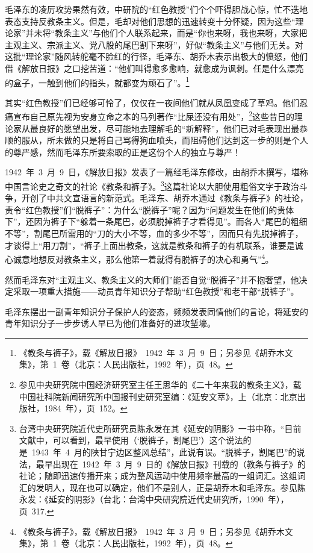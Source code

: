毛泽东的凌厉攻势果然有效，中研院的“红色教授”们个个吓得胆战心惊，忙不迭地表态支持反教条主义。但是，毛却对他们思想的迅速转变十分怀疑，因为这些“理论家”并未将“教条主义”与他们个人联系起来，而是“你也来呀，我也来呀，大家把主观主义、宗派主义、党八股的尾巴割下来呀”，好似“教条主义”与他们无关。对这批“理论家”随风转舵毫不脸红的行径，毛泽东、胡乔木表示出极大的愤怒，他们借《解放日报》之口挖苦道：“他们叫得愈多愈响，就愈成为讽刺。任是什么漂亮的盒子，一触到他们的指头，就都变为顽石了”。\footnote{《教条与裤子》，载《解放日报》~1942~年~3~月~9~日；另参见《胡乔木文集》，第~1~卷（北京：人民出版社，1992~年），页~48。}

其实“红色教授”们已经够可怜了，仅仅在一夜间他们就从凤凰变成了草鸡。他们忍痛宣布自己原先视为安身立命之本的马列著作“比屎还没有用处”，\footnote{参见中央研究院中国经济研究室主任王思华的《二十年来我的教条主义》，载中国社科院新闻研究所中国报刊史研究室编：《延安文萃》，上（北京：北京出版社，1984~年），页~152。}这些昔日的理论家从最良好的愿望出发，尽可能地去理解毛的“新解释”，他们已对毛表现出最恭顺的服从，所未做的只是将自己骂得狗血喷头，而阻碍他们达到这一步的则是个人的尊严感，然而毛泽东所要索取的正是这份个人的独立与尊严！


1942~年~3~月~9~日，《解放日报》发表了一篇经毛泽东修改，由胡乔木撰写，堪称中国言论史之奇文的社论《教条和裤子》。\footnote{台湾中央研究院近代史所研究员陈永发在其《延安的阴影》一书中称，“目前文献中，可以看到，最早使用（‘脱裤子，割尾巴’）这个说法的是~1943~年~4~月的陕甘宁边区整风总结”，此说有误。“脱裤子，割尾巴”的说法，最早出现在~1942~年~3~月~9~日的《解放日报》刊载的（教条与裤子》的社论；随即迅速传播开来；成为整风运动中使用频率最高的一组词汇。这组词汇的发明人，现在也可以确定，他们不是别人，正是胡乔木和毛泽东。参见陈永发：《延安的阴影》（台北：台湾中央研究院近代史研究所，1990~年），页~317.}这篇社论以大胆使用粗俗文字于政治斗争，开创了中共文宣语言的新范式。毛泽东、胡乔木通过《教条与裤子》的社论，责令“红色教授”们“脱裤子”：为什么“脱裤子”呢？因为“问题发生在他们的贵体下”，还因为裤子下“躲着一条尾巴，必须脱掉裤子才看得见”。而各人“尾巴的粗细不等”，割尾巴所需用的“刀的大小不等，血的多少不等”，因而只有先脱掉裤子，才谈得上“用刀割”，“裤子上面出教条，这就是教条和裤子的有机联系，谁要是诚心诚意地想反对教条主义，那么他第一着就得有脱裤子的决心和勇气”\footnote{《教条与裤子》，载《解放日报》~1942~年~3~月~9~日；另参见《胡乔木文集》，第~1~卷（北京：人民出版社，1992~年），页~48。}。

然而毛泽东对“主观主义、教条主义的大师们”能否自觉“脱裤子”并不抱奢望，他决定采取一项重大措施——动员青年知识分子帮助“红色教授”和老干部“脱裤子”。

毛泽东摆出一副青年知识分子保护人的姿态，频频发表同情他们的言论，将延安的青年知识分子一步步诱人早已为他们准备好的进攻堑壕。

